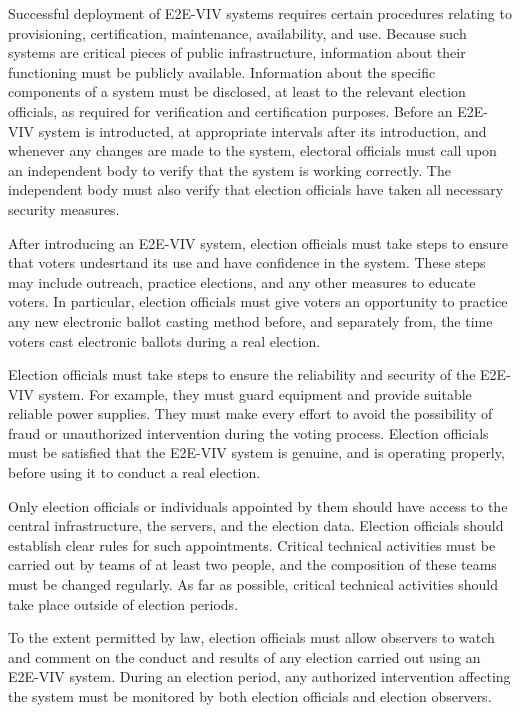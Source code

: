 Successful deployment of E2E-VIV systems requires certain procedures
relating to provisioning, certification, maintenance, availability,
and use. Because such systems are critical pieces of public
infrastructure, information about their functioning must be publicly
available. Information about the specific components of a system must
be disclosed, at least to the relevant election officials, as required
for verification and certification purposes. Before an E2E-VIV system
is introducted, at appropriate intervals after its introduction, and
whenever any changes are made to the system, electoral officials must
call upon an independent body to verify that the system is working
correctly. The independent body must also verify that election
officials have taken all necessary security measures.

After introducing an E2E-VIV system, election officials must take
steps to ensure that voters undesrtand its use and have confidence in
the system. These steps may include outreach, practice elections, and
any other measures to educate voters. In particular, election
officials must give voters an opportunity to practice any new
electronic ballot casting method before, and separately from, the time
voters cast electronic ballots during a real election.

Election officials must take steps to ensure the reliability and
security of the E2E-VIV system. For example, they must guard equipment
and provide suitable reliable power supplies. They must make every
effort to avoid the possibility of fraud or unauthorized intervention
during the voting process. Election officials must be satisfied that
the E2E-VIV system is genuine, and is operating properly, before using
it to conduct a real election.

Only election officials or individuals appointed by them should have
access to the central infrastructure, the servers, and the election
data. Election officials should establish clear rules for such
appointments. Critical technical activities must be carried out by
teams of at least two people, and the composition of these teams must
be changed regularly. As far as possible, critical technical
activities should take place outside of election periods.

To the extent permitted by law, election officials must allow
observers to watch and comment on the conduct and results of any
election carried out using an E2E-VIV system. During an election
period, any authorized intervention affecting the system must be
monitored by both election officials and election observers.

